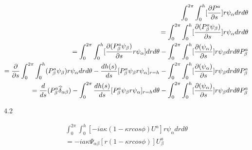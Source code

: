 \documentclass{Note}
\begin{document}
\begin{equation}
\begin{aligned}
\int_0^{2\pi} \int_0^h [{\partial P^a\over {\partial s}}] r\psi_\alpha dr d\theta\\
=\int_0^{2\pi} \int_0^h [{\partial (P_\beta^a \psi_\beta) \over {\partial s}}] r\psi_\alpha dr d\theta\\
=\int_0^{2\pi} \int_0^h [{\partial (P_\beta^a \psi_\beta) \over {\partial s}}r\psi_\alpha]  dr d\theta
-\int_0^{2\pi} \int_0^h [{\partial (\psi_\alpha) \over {\partial s}}] r  \psi_\beta dr d\theta P_\beta^a\\
={\partial \over {\partial s}} \int_0^{2\pi} \int_0^h  (P_\beta^a \psi_\beta) r\psi_\alpha  dr d\theta
-{dh(s)\over ds}[P_\beta^a \psi_\beta r\psi_\alpha ]_{r=h}
-\int_0^{2\pi} \int_0^h [{\partial (\psi_\alpha) \over {\partial s}}] r  \psi_\beta dr d\theta P_\beta^a\\
={d \over {d s}} (P_\beta^a \widehat{\delta }_{\alpha\beta})
-\int_0^{2\pi}{dh(s)\over ds}[P_\beta^a \psi_\beta r\psi_\alpha ]_{r=h}d\theta
-\int_0^{2\pi} \int_0^h [{\partial (\psi_\alpha) \over {\partial s}}] r  \psi_\beta dr d\theta P_\beta^a\\
\end{aligned}
\end{equation}




4.2 

\begin{equation}
\begin{aligned}
\int_0^{2\pi} \int_0^h [-ia\kappa(1-\kappa rcos\phi) U^a] r\psi_\alpha dr d\theta\\
=-ia\kappa \Psi_{\alpha\beta}[r(1-\kappa rcos\phi)]U_\beta^a
\end{aligned}
\end{equation}
\end{document}
